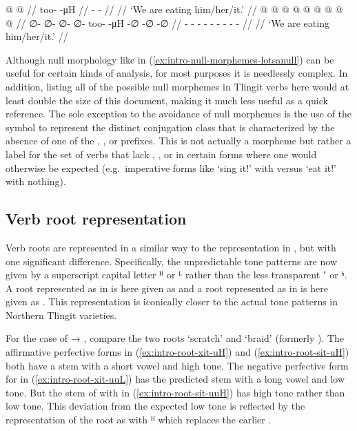 \documentclass[12pt,letterpaper,oneside,article]{memoir}
\begin{document}
\pex\label{ex:intro-null-morphemes}%
\a\label{ex:intro-null-morphemes-nonull}%
\begingl
	\gla	{} @ {} @ {} //
	\glb	too-  -μH //
	\glc	{}-  - //
	\gld	{} {} {} //
	\glft	‘We are eating him/her/it.’
		//
\endgl
\a\label{ex:intro-null-morphemes-lotsanull}%
\begingl
	\gla	{} @ {} @ {} @ {} @ {} @ {} @ {} @ {} @ {} @ {} //
	\glb	∅- ∅- ∅- ∅- too-  -μH -∅ -∅ -∅ //
	\glc	{}- - - - -
		 - - - - //
	\gld	{} {} {} {} {} {} {} {} {} {} //
	\glft	‘We are eating him/her/it.’
		//
\endgl
\xe

Although null morphology like in (\ref{ex:intro-null-morphemes-lotsanull}) can be useful for certain kinds of analysis, for most purposes it is needlessly complex.
In addition, listing all of the possible null morphemes in Tlingit verbs here would at least double the size of this document, making it much less useful as a quick reference.
The sole exception to the avoidance of null morphemes is the use of the symbol  to represent the distinct conjugation class that is characterized by the absence of one of the , , or  prefixes.
This  is not actually a morpheme but rather a label for the set of verbs that lack , , or  in certain forms where one would otherwise be expected (e.g.\ imperative forms like  ‘sing it!’
 with  versus  ‘eat it!’ with nothing).

\subsection{Verb root representation}\label{sec:intro-root}

Verb roots are represented in a similar way to the representation in \cite{crippen:2019}, but with one significant difference.
Specifically, the unpredictable tone patterns are now given by a superscript capital letter ᴴ or ᴸ rather than the less transparent ʼ or ʰ.
A root represented as  in \cite{crippen:2019} is here given as  and a root represented as  in \cite{crippen:2019} is here given as .
This representation is iconically closer to the actual tone patterns in Northern Tlingit varieties.

For the case of  → , compare the two roots  ‘scratch’ and  ‘braid’ (formerly ).
The affirmative perfective forms in (\ref{ex:intro-root-xit-uH}) and (\ref{ex:intro-root-sit-uH}) both have a  stem with a short vowel and high tone.
The negative perfective form for  in (\ref{ex:intro-root-xit-uuL}) has the predicted  stem with a long vowel and low tone.
But the stem of  with  in (\ref{ex:intro-root-sit-uuH}) has high tone rather than low tone.
This deviation from the expected low tone is reflected by the representation of the root as  with ᴴ which replaces the earlier .
\end{document}
